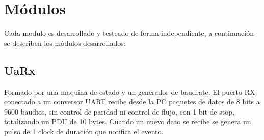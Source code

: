 \documentclass[12pt]{article}
\begin{document}
\section{Módulos}
Cada modulo es desarrollado y testeado de forma independiente, a continuación se describen los módulos desarrollados:
\subsection{UaRx}
Formado por una maquina de estado y un generador de baudrate. El puerto RX conectado a un conversor UART recibe desde la PC paquetes de datos de 8 bits a 9600 baudios, sin control de paridad ni control de flujo, con 1 bit de stop, totalizando un PDU de 10 bytes. Cuando un nuevo dato se recibe se genera un pulso de 1 clock de duración que notifica el evento.
\end{document}
